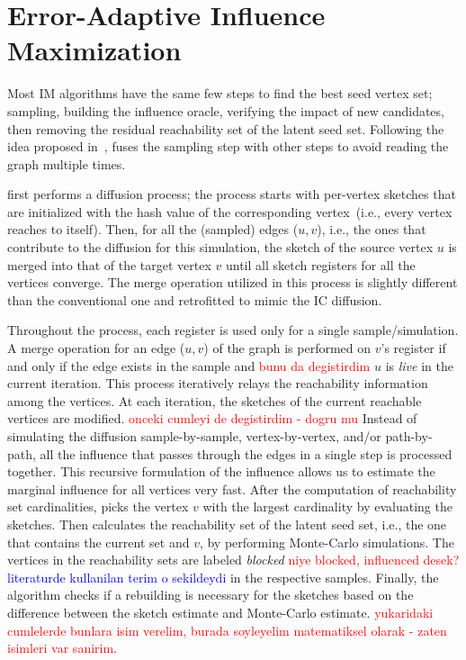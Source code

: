 \documentclass[10pt,journal,compsoc]{IEEEtran}
\newcommand\ggx[1]{\textcolor{blue}{#1}}
\newcommand\acro{{\sc{HyperFuseR\xspace}\xspace}\xspace}
\newcommand\kktodo[1]{\textcolor{red}{#1}}
\begin{document}
\section{Error-Adaptive Influence Maximization}\label{sec:method}

Most IM algorithms have the same few steps to find the best seed vertex set; sampling, building the influence oracle, verifying the impact of new candidates, then removing the residual reachability set of the latent seed set. Following the idea proposed in~\cite{infuser}, \acro fuses the sampling step with other steps to avoid reading the graph multiple times. 

\acro first performs a diffusion process; the process starts with per-vertex sketches that are initialized with the hash value of the corresponding vertex~(i.e., every vertex reaches to itself). Then, for all the (sampled) edges ($u, v$), i.e., the ones that contribute to the diffusion for this simulation, the sketch of the source vertex $u$ is merged into that of the target vertex $v$ until all sketch registers for all the vertices converge. The merge operation utilized in this process is slightly different than the conventional one and retrofitted to mimic the IC diffusion. 

Throughout the process, each register is used only for a single sample/simulation. A merge operation for an edge ($u, v$) of the graph is performed on $v$'s register if and only if the edge exists in the sample and \kktodo{bunu da degistirdim} $u$ is {\em live} in the current iteration. This process iteratively relays the reachability information among the vertices. At each iteration, the sketches of the current reachable vertices are modified. \kktodo{onceki cumleyi de degistirdim - dogru mu} 
Instead of simulating the diffusion sample-by-sample, vertex-by-vertex, and/or path-by-path, all the influence that passes through the edges in a single step is processed together. 
This recursive formulation of the influence allows us to estimate the marginal influence for all vertices very fast. 
After the computation of reachability set cardinalities, \acro picks the vertex $v$ with the largest cardinality by evaluating the sketches. Then \acro calculates the reachability set of the latent seed set, i.e., the one that contains the current set and $v$, by performing Monte-Carlo simulations. The vertices in the reachability sets are labeled {\em blocked} \kktodo{niye blocked, influenced desek?}\ggx{literaturde kullanilan terim o sekildeydi} in the respective samples. Finally, the algorithm checks if a rebuilding is necessary for the sketches based on the difference between the sketch estimate and Monte-Carlo estimate. \kktodo{yukaridaki cumlelerde bunlara isim verelim, burada soyleyelim matematiksel olarak - zaten isimleri var sanirim}. 
\end{document}
